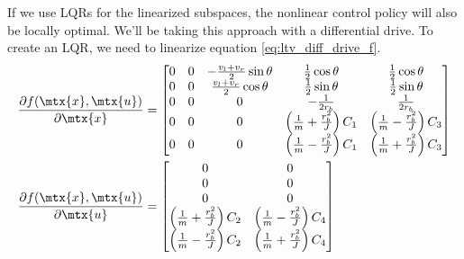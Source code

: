 If we use LQRs for the linearized subspaces, the nonlinear control policy will
also be locally optimal. We'll be taking this approach with a differential
drive. To create an LQR, we need to linearize equation
\eqref{eq:ltv_diff_drive_f}.
\begin{align*}
  \frac{\partial f(\mtx{x}, \mtx{u})}{\partial\mtx{x}} &=
  \begin{bmatrix}
    0 & 0 & -\frac{v_l + v_r}{2}\sin\theta & \frac{1}{2}\cos\theta &
      \frac{1}{2}\cos\theta \\
    0 & 0 & \frac{v_l + v_r}{2}\cos\theta & \frac{1}{2}\sin\theta &
      \frac{1}{2}\sin\theta \\
    0 & 0 & 0 & -\frac{1}{2r_b} & \frac{1}{2r_b} \\
    0 & 0 & 0 & \left(\frac{1}{m} + \frac{r_b^2}{J}\right) C_1 &
      \left(\frac{1}{m} - \frac{r_b^2}{J}\right) C_3 \\
    0 & 0 & 0 & \left(\frac{1}{m} - \frac{r_b^2}{J}\right) C_1 &
      \left(\frac{1}{m} + \frac{r_b^2}{J}\right) C_3
  \end{bmatrix} \\
  \frac{\partial f(\mtx{x}, \mtx{u})}{\partial\mtx{u}} &=
  \begin{bmatrix}
    0 & 0 \\
    0 & 0 \\
    0 & 0 \\
    \left(\frac{1}{m} + \frac{r_b^2}{J}\right) C_2 &
    \left(\frac{1}{m} - \frac{r_b^2}{J}\right) C_4 \\
    \left(\frac{1}{m} - \frac{r_b^2}{J}\right) C_2 &
    \left(\frac{1}{m} + \frac{r_b^2}{J}\right) C_4
  \end{bmatrix}
\end{align*}

